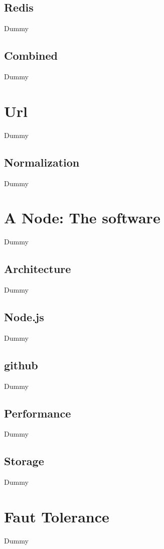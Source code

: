 \subsection{Redis}
Dummy
\subsection{Combined}
Dummy

\section{Url}
Dummy
\subsection{Normalization}
Dummy

\section{A Node: The software}
Dummy
\subsection{Architecture}
Dummy
\subsection{Node.js}
Dummy
\subsection{github}
Dummy
\subsection{Performance}
Dummy
\subsection{Storage}
Dummy

\section{Faut Tolerance}
Dummy

